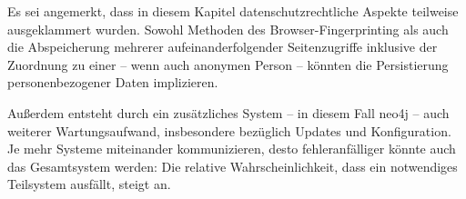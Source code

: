 Es sei angemerkt, dass in diesem Kapitel datenschutzrechtliche Aspekte teilweise ausgeklammert wurden. Sowohl Methoden des Browser-Fingerprinting als auch die Abspeicherung mehrerer aufeinanderfolgender Seitenzugriffe inklusive der Zuordnung zu einer -- wenn auch anonymen Person -- könnten die Persistierung personenbezogener Daten implizieren.

Außerdem entsteht durch ein zusätzliches System -- in diesem Fall neo4j -- auch weiterer Wartungsaufwand, insbesondere bezüglich Updates und Konfiguration. Je mehr Systeme miteinander kommunizieren, desto fehleranfälliger könnte auch das Gesamtsystem werden: Die relative Wahrscheinlichkeit, dass ein notwendiges Teilsystem ausfällt, steigt an.

